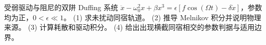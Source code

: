 受弱驱动与阻尼的双阱 Duffing 系统 $\ddot x-\omega_0^2x+\beta x^3=\epsilon[f\cos(\Omega t)-\delta\dot x]$，参数均为正，$0<\epsilon\ll1$。
(1) 求未扰动同宿轨道。
(2) 推导 Melnikov 积分并说明物理来源。
(3) 计算耗散和驱动积分。
(4) 给出出现横截同宿相交的参数判据与适用边界。
